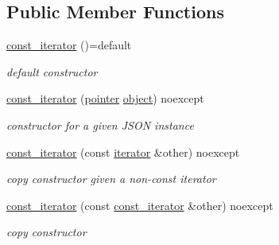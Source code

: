 \subsection*{Public Member Functions}
\begin{DoxyCompactItemize}
\item 
\hypertarget{classnlohmann_1_1basic__json_1_1const__iterator_ac6fdaff67857f82a623e5cc253917639}{}\label{classnlohmann_1_1basic__json_1_1const__iterator_ac6fdaff67857f82a623e5cc253917639} 
\hyperlink{classnlohmann_1_1basic__json_1_1const__iterator_ac6fdaff67857f82a623e5cc253917639}{const\+\_\+iterator} ()=default
\begin{DoxyCompactList}\small\item\em default constructor \end{DoxyCompactList}\item 
\hyperlink{classnlohmann_1_1basic__json_1_1const__iterator_a23de834b11bd895209aa65c100ab9ceb}{const\+\_\+iterator} (\hyperlink{classnlohmann_1_1basic__json_1_1const__iterator_a1da96fc3054d547e7706d3a2f073f389}{pointer} \hyperlink{classnlohmann_1_1basic__json_ad25b2f8c21e241e2d63455537a9294ff}{object}) noexcept
\begin{DoxyCompactList}\small\item\em constructor for a given J\+S\+ON instance \end{DoxyCompactList}\item 
\hyperlink{classnlohmann_1_1basic__json_1_1const__iterator_a6b950c6bc081ac1ec1540ec05ceb2603}{const\+\_\+iterator} (const \hyperlink{classnlohmann_1_1basic__json_1_1iterator}{iterator} \&other) noexcept
\begin{DoxyCompactList}\small\item\em copy constructor given a non-\/const iterator \end{DoxyCompactList}\item 
\hyperlink{classnlohmann_1_1basic__json_1_1const__iterator_a18c35a6735d3da96b4fc026421c05dd8}{const\+\_\+iterator} (const \hyperlink{classnlohmann_1_1basic__json_1_1const__iterator}{const\+\_\+iterator} \&other) noexcept
\begin{DoxyCompactList}\small\item\em copy constructor \end{DoxyCompactList}\item 

\end{DoxyCompactItemize}
